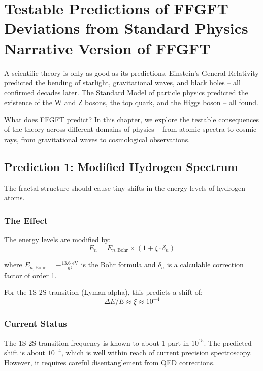 \chapter{Testable Predictions of FFGFT  Deviations from Standard Physics  Narrative Version of FFGFT}



A scientific theory is only as good as its predictions. Einstein's General Relativity predicted the bending of starlight, gravitational waves, and black holes -- all confirmed decades later. The Standard Model of particle physics predicted the existence of the W and Z bosons, the top quark, and the Higgs boson -- all found.

What does FFGFT predict? In this chapter, we explore the testable consequences of the theory across different domains of physics -- from atomic spectra to cosmic rays, from gravitational waves to cosmological observations.

\section{Prediction 1: Modified Hydrogen Spectrum}

The fractal structure should cause tiny shifts in the energy levels of hydrogen atoms.

\subsection{The Effect}

The energy levels are modified by:
\begin{equation}
E_n = E_{n,\text{Bohr}} \times \left(1 + \xi \cdot \delta_n\right)
\end{equation}

where $E_{n,\text{Bohr}} = -\frac{13.6\text{ eV}}{n^2}$ is the Bohr formula and $\delta_n$ is a calculable correction factor of order 1.

For the 1S-2S transition (Lyman-alpha), this predicts a shift of:
\begin{equation}
\Delta E / E \approx \xi \approx 10^{-4}
\end{equation}

\subsection{Current Status}

The 1S-2S transition frequency is known to about 1 part in $10^{15}$. The predicted shift is about $10^{-4}$, which is well within reach of current precision spectroscopy. However, it requires careful disentanglement from QED corrections.

